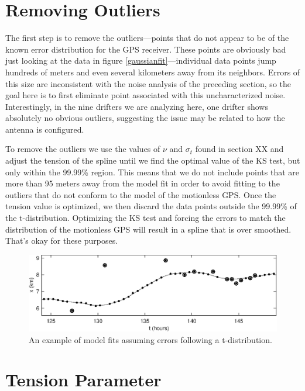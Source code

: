 \documentclass[twocol]{ametsoc}
\begin{document}
\section{Removing Outliers}

The first step is to remove the outliers---points that do not appear to be of the known error distribution for the GPS receiver. These points are obviously bad just looking at the data in figure \ref{gaussianfit}---individual data points jump hundreds of meters and even several kilometers away from its neighbors. Errors of this size are inconsistent with the noise analysis of the preceding section, so the goal here is to first eliminate point associated with this uncharacterized noise. Interestingly, in the nine drifters we are analyzing here, one drifter shows absolutely no obvious outliers, suggesting the issue may be related to how the antenna is configured.

To remove the outliers we use the values of $\nu$ and $\sigma_t$ found in section XX and adjust the tension of the spline until we find the optimal value of the KS test, but only within the 99.99\% region. This means that we do not include points that are more than 95 meters away from the model fit in order to avoid fitting to the outliers that do not conform to the model of the motionless GPS. Once the tension value is optimized, we then discard the data points outside the 99.99\% of the t-distribution. Optimizing the KS test and forcing the errors to match the distribution of the motionless GPS will result in a spline that is over smoothed. That's okay for these purposes.




\begin{figure}[t]
  \centerline{\includegraphics[width=39pc,angle=0]{tdistributionfit}}
  
  \caption{An example of model fits assuming errors following a t-distribution.}
  \label{tdistributionfit}
\end{figure}
\section{Tension Parameter}
\end{document}
